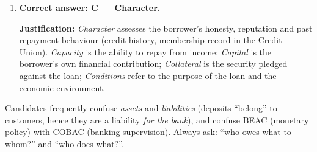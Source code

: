 \documentclass[11pt]{article}
\begin{document}
\begin{corrige}
\begin{enumerate}
\item \textbf{Correct answer: C — Character.}\par
\textbf{Justification:} \emph{Character} assesses the borrower's honesty, reputation and past repayment behaviour (credit history, membership record in the Credit Union). \emph{Capacity} is the ability to repay from income; \emph{Capital} is the borrower's own financial contribution; \emph{Collateral} is the security pledged against the loan; \emph{Conditions} refer to the purpose of the loan and the economic environment.
\end{enumerate}

\begin{attention}
Candidates frequently confuse \emph{assets} and \emph{liabilities} (deposits ``belong'' to customers, hence they are a liability \emph{for the bank}), and confuse BEAC (monetary policy) with COBAC (banking supervision). Always ask: ``who owes what to whom?'' and ``who does what?''.
\end{attention}
\end{corrige}
\end{document}
